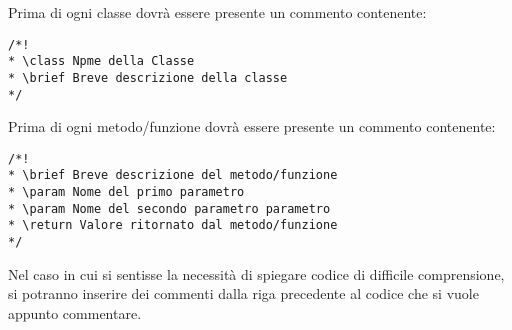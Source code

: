 Prima di ogni classe dovrà essere presente un commento contenente:
\begin{lstlisting}
/*!
* \class Npme della Classe
* \brief Breve descrizione della classe
*/
\end{lstlisting}

Prima di ogni metodo/funzione dovrà essere presente un commento contenente: 
\begin{lstlisting}
/*!
* \brief Breve descrizione del metodo/funzione
* \param Nome del primo parametro
* \param Nome del secondo parametro parametro
* \return Valore ritornato dal metodo/funzione
*/
\end{lstlisting}

Nel caso in cui si sentisse la necessità di spiegare codice di difficile comprensione, si potranno inserire dei commenti dalla riga precedente al codice che si vuole appunto commentare.